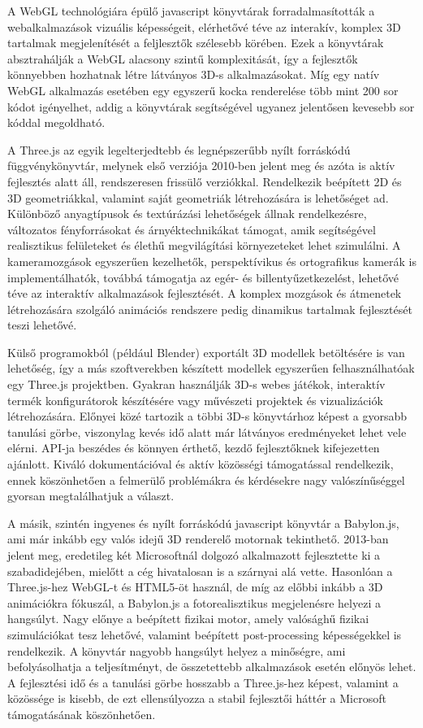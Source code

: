 \documentclass[12pt]{report}
\begin{document}
        A WebGL technológiára épülő javascript könyvtárak forradalmasították a webalkalmazások vizuális képességeit, elérhetővé téve az interakív, komplex 3D tartalmak megjelenítését a feljlesztők szélesebb körében. Ezek a könyvtárak absztrahálják a WebGL alacsony szintű komplexitását, így a fejlesztők könnyebben hozhatnak létre látványos 3D-s alkalmazásokat. Míg egy natív WebGL alkalmazás esetében egy egyszerű kocka renderelése több mint 200 sor kódot igényelhet, addig a könyvtárak segítségével ugyanez jelentősen kevesebb sor kóddal megoldható.
        
        A Three.js az egyik legelterjedtebb és legnépszerűbb nyílt forráskódú függvénykönyvtár, melynek első verziója 2010-ben jelent meg és azóta is aktív fejlesztés alatt áll, rendszeresen frissülő verziókkal. Rendelkezik beépített 2D és 3D geometriákkal, valamint saját geometriák létrehozására is lehetőséget ad. Különböző anyagtípusok és textúrázási lehetőségek állnak rendelkezésre, változatos fényforrásokat és árnyéktechnikákat támogat, amik segítségével realisztikus felületeket és élethű megvilágítási környezeteket lehet szimulálni. A kameramozgások egyszerűen kezelhetők, perspektívikus és ortografikus kamerák is implementálhatók, továbbá támogatja az egér- és billentyűzetkezelést, lehetővé téve az interaktív alkalmazások fejlesztését. A komplex mozgások és átmenetek létrehozására szolgáló animációs rendszere pedig dinamikus tartalmak fejlesztését teszi lehetővé. 
        
        Külső programokból (például Blender) exportált 3D modellek betöltésére is van lehetőség, így a más szoftverekben készített modellek egyszerűen felhasználhatóak egy Three.js projektben. Gyakran használják 3D-s webes játékok, interaktív termék konfigurátorok készítésére vagy művészeti projektek és vizualizációk létrehozására. Előnyei közé tartozik a többi 3D-s könyvtárhoz képest a gyorsabb tanulási görbe, viszonylag kevés idő alatt már látványos eredményeket lehet vele elérni. API-ja beszédes és könnyen érthető, kezdő fejlesztőknek kifejezetten ajánlott. Kiváló dokumentációval és aktív közösségi támogatással rendelkezik, ennek köszönhetően a felmerülő problémákra és kérdésekre nagy valószínűséggel gyorsan megtalálhatjuk a választ. 
        
        A másik, szintén ingyenes és nyílt forráskódú javascript könyvtár a Babylon.js, ami már inkább egy valós idejű 3D renderelő motornak tekinthető. 2013-ban jelent meg, eredetileg két Microsoftnál dolgozó alkalmazott fejlesztette ki a szabadidejében, mielőtt a cég hivatalosan is a szárnyai alá vette. Hasonlóan a Three.js-hez WebGL-t és HTML5-öt használ, de míg az előbbi inkább a 3D animációkra fókuszál, a Babylon.js a fotorealisztikus megjelenésre helyezi a hangsúlyt. Nagy előnye a beépített fizikai motor, amely valósághű fizikai szimulációkat tesz lehetővé, valamint beépített post-processing képességekkel is rendelkezik. A könyvtár nagyobb hangsúlyt helyez a minőségre, ami befolyásolhatja a teljesítményt, de összetettebb alkalmazások esetén előnyös lehet. A fejlesztési idő és a tanulási görbe hosszabb a Three.js-hez képest, valamint a közössége is kisebb, de ezt ellensúlyozza a stabil fejlesztői háttér a Microsoft támogatásának köszönhetően.
\end{document}
